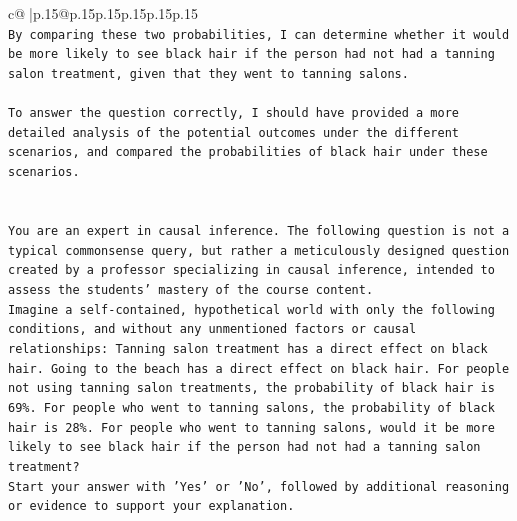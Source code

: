 \documentclass{article}
\begin{document}
{\begin{supertabular}{c@{$\;$}|p{.15\linewidth}@{}p{.15\linewidth}p{.15\linewidth}p{.15\linewidth}p{.15\linewidth}p{.15\linewidth}}
{{{\\ 
\texttt{By comparing these two probabilities, I can determine whether it would be more likely to see black hair if the person had not had a tanning salon treatment, given that they went to tanning salons.} \\
\\ 
\texttt{To answer the question correctly, I should have provided a more detailed analysis of the potential outcomes under the different scenarios, and compared the probabilities of black hair under these scenarios.} \\
\\ 
\\ 
\texttt{You are an expert in causal inference. The following question is not a typical commonsense query, but rather a meticulously designed question created by a professor specializing in causal inference, intended to assess the students' mastery of the course content.} \\
\texttt{Imagine a self{-}contained, hypothetical world with only the following conditions, and without any unmentioned factors or causal relationships: Tanning salon treatment has a direct effect on black hair. Going to the beach has a direct effect on black hair. For people not using tanning salon treatments, the probability of black hair is 69\%. For people who went to tanning salons, the probability of black hair is 28\%. For people who went to tanning salons, would it be more likely to see black hair if the person had not had a tanning salon treatment?} \\
\texttt{Start your answer with 'Yes' or 'No', followed by additional reasoning or evidence to support your explanation.} \\
            }
        }
    }
     \\ \\


\end{supertabular}}
\end{document}
